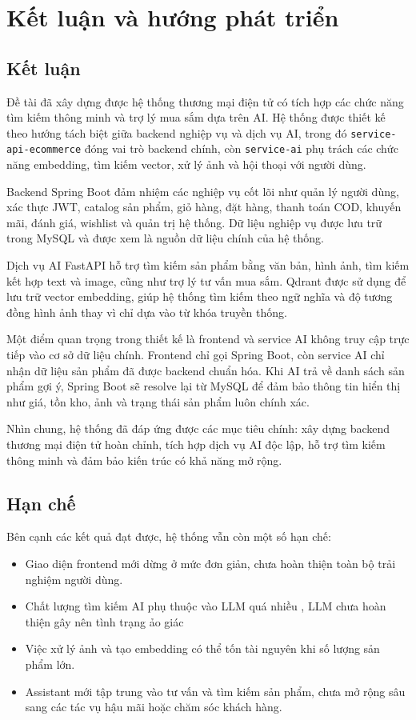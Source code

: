\section{Kết luận và hướng phát triển}

\subsection{Kết luận}

Đề tài đã xây dựng được hệ thống thương mại điện tử có tích hợp các chức năng tìm kiếm thông minh và trợ lý mua sắm dựa trên AI. Hệ thống được thiết kế theo hướng tách biệt giữa backend nghiệp vụ và dịch vụ AI, trong đó \verb|service-api-ecommerce| đóng vai trò backend chính, còn \verb|service-ai| phụ trách các chức năng embedding, tìm kiếm vector, xử lý ảnh và hội thoại với người dùng.

Backend Spring Boot đảm nhiệm các nghiệp vụ cốt lõi như quản lý người dùng, xác thực JWT, catalog sản phẩm, giỏ hàng, đặt hàng, thanh toán COD, khuyến mãi, đánh giá, wishlist và quản trị hệ thống. Dữ liệu nghiệp vụ được lưu trữ trong MySQL và được xem là nguồn dữ liệu chính của hệ thống.

Dịch vụ AI FastAPI hỗ trợ tìm kiếm sản phẩm bằng văn bản, hình ảnh, tìm kiếm kết hợp text và image, cũng như trợ lý tư vấn mua sắm. Qdrant được sử dụng để lưu trữ vector embedding, giúp hệ thống tìm kiếm theo ngữ nghĩa và độ tương đồng hình ảnh thay vì chỉ dựa vào từ khóa truyền thống.

Một điểm quan trọng trong thiết kế là frontend và service AI không truy cập trực tiếp vào cơ sở dữ liệu chính. Frontend chỉ gọi Spring Boot, còn service AI chỉ nhận dữ liệu sản phẩm đã được backend chuẩn hóa. Khi AI trả về danh sách sản phẩm gợi ý, Spring Boot sẽ resolve lại từ MySQL để đảm bảo thông tin hiển thị như giá, tồn kho, ảnh và trạng thái sản phẩm luôn chính xác.

Nhìn chung, hệ thống đã đáp ứng được các mục tiêu chính: xây dựng backend thương mại điện tử hoàn chỉnh, tích hợp dịch vụ AI độc lập, hỗ trợ tìm kiếm thông minh và đảm bảo kiến trúc có khả năng mở rộng.

\subsection{Hạn chế}

Bên cạnh các kết quả đạt được, hệ thống vẫn còn một số hạn chế:

\begin{itemize}
    \item Giao diện frontend mới dừng ở mức đơn giản, chưa hoàn thiện toàn bộ trải nghiệm người dùng.
    \item Chất lượng tìm kiếm AI phụ thuộc vào LLM quá nhiều , LLM chưa hoàn thiện gây nên tình trạng ảo giác
    \item Việc xử lý ảnh và tạo embedding có thể tốn tài nguyên khi số lượng sản phẩm lớn.
    \item Assistant mới tập trung vào tư vấn và tìm kiếm sản phẩm, chưa mở rộng sâu sang các tác vụ hậu mãi hoặc chăm sóc khách hàng.
\end{itemize}

